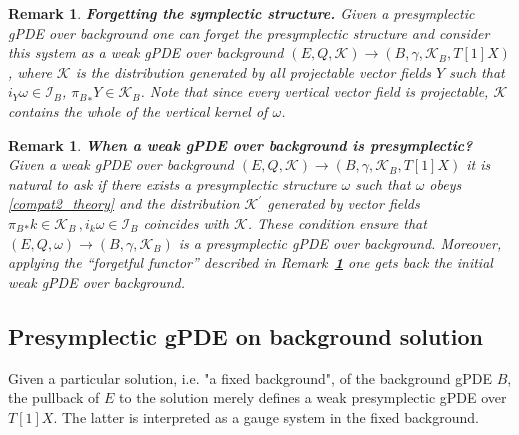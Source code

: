 \documentclass[a4paper,12pt]{article}
\numberwithin{equation}{section} %
\newtheorem{rem}[thm]{Remark}
\newcommand{\bref}[1]{\textbf{\ref{#1}}}
\def\cI{\mathcal{I}}
\def\cK{\mathcal{K}}
\begin{document}
\begin{rem} \label{rem:forget}
    \textbf{Forgetting the symplectic structure.} Given a presymplectic gPDE over background one can forget the presymplectic structure and consider this system as a weak gPDE over background $(E,Q,\cK) \to (B,\gamma,\cK_B,T[1]X)$, where $\cK$ is the distribution generated by all projectable vector fields $Y$ such that $i_Y\omega \in \cI_B$, ${\pi_B}_*Y \in \cK_B$. Note that since every vertical vector field is projectable, $\cK$ contains the whole of the vertical kernel of $\omega$. 
\end{rem}

\begin{rem}
    \textbf{When a weak gPDE over background is presymplectic?}  Given a weak gPDE over background $(E, Q, \cK) \to  (B, \gamma, \cK_B, T[1]X)$ it is natural to ask if there exists a presymplectic structure $\omega$ such that $\omega$ obeys \eqref{compat2_theory} and the distribution $\cK^\prime$ generated by vector fields $ \pi_B{}_* k \in \cK_B\,, i_k \omega \in \cI_B$ coincides with $\cK$. These condition ensure that  $(E, Q, \omega) \to (B, \gamma, \cK_B)$ is a presymplectic gPDE over background. Moreover, applying the ``forgetful functor'' described in Remark~\bref{rem:forget} one gets back the initial weak gPDE over background.
\end{rem}








\subsection{Presymplectic gPDE on background solution}
Given a particular solution, i.e. "a fixed background", of the background gPDE $B$, the pullback of $E$ to the solution merely defines a weak presymplectic gPDE over $T[1]X$. The latter is interpreted as a gauge system in the fixed background. 
\end{document}
